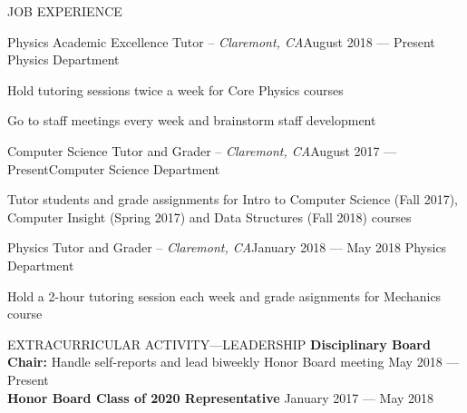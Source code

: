 \documentclass{resume} %
\begin{document}
\begin{rSection}{JOB EXPERIENCE}
\begin{rSubsection}{Physics Academic Excellence Tutor -- {\it Claremont, CA}}{August 2018 --- Present}
{Physics Department}

\item Hold tutoring sessions twice a week for Core Physics courses
\item Go to staff meetings every week and brainstorm staff development
\end{rSubsection}
\begin{rSubsection}{Computer Science Tutor and Grader -- {\it Claremont, CA}}{August 2017 --- Present}{Computer Science Department}

\item Tutor students and grade assignments for Intro to Computer Science (Fall 2017), Computer Insight (Spring 2017) and Data Structures (Fall 2018) courses
\end{rSubsection}
\begin{rSubsection}{Physics Tutor and Grader -- {\it Claremont, CA}}{January 2018 --- May 2018}
{Physics Department}

\item Hold a 2-hour tutoring session each week and grade asignments for Mechanics course
\end{rSubsection}
\end{rSection}
\begin{rSection}{EXTRACURRICULAR ACTIVITY---LEADERSHIP}
\textbf{Disciplinary Board Chair:} Handle self-reports and lead biweekly Honor Board meeting \hfill {May 2018 ---Present}\\
\textbf{Honor Board Class of 2020 Representative} \hfill {January 2017 --- May 2018}
\end{rSection}

\end{document}
